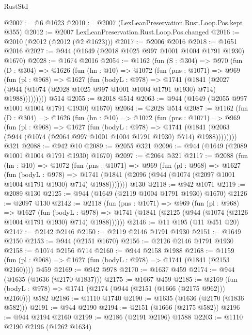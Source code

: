 \begin{lexlean}{RustStd}
\begin{coremodule}
@2007 := @6 @1623
@2010 := @2007 (LexLeanPreservation.Rust.Loop.Pos.kept @355)
@2012 := @2007 LexLeanPreservation.Rust.Loop.Pos.changed
@2016 := @2010 (@2012 (@2012 (@2 @1623)))
@2017 := @2006 @2016
@2018 := @1651 @2016
@2027 := @944 (@1649 (@2018 @1025 @997 @1001 @1004 @1791 @1930) @1670)
@2028 := @1674 @2016
@2054 := @1162
    (fun (S : @304) =>
    @970
      (fun (D : @304) =>
      @1626
        (fun (hn : @10) =>
        @1072
          (fun (pns : @1071) =>
          @969
            (fun (pl : @968) =>
            @1627
              (fun (bodyL : @978) =>
              @1741
                (@1841
                  (@2027
                    (@944 (@1074 (@2028 @1025 @997 @1001 @1004 @1791 @1930) @714) @1988)))))))))
    @514
@2055 := @2018 @514
@2063 := @944 (@1649 (@2055 @997 @1001 @1004 @1791 @1930) @1670)
@2064 := @2028 @514
@2087 := @1162
    (fun (D : @304) =>
    @1626
      (fun (hn : @10) =>
      @1072
        (fun (pns : @1071) =>
        @969
          (fun (pl : @968) =>
          @1627
            (fun (bodyL : @978) =>
            @1741
              (@1841 (@2063 (@944 (@1074 (@2064 @997 @1001 @1004 @1791 @1930) @714) @1988))))))))
    @321
@2088 := @942 @10
@2089 := @2055 @321
@2096 := @944 (@1649 (@2089 @1001 @1004 @1791 @1930) @1670)
@2097 := @2064 @321
@2117 := @2088
    (fun (hn : @10) =>
    @1072
      (fun (pns : @1071) =>
      @969
        (fun (pl : @968) =>
        @1627
          (fun (bodyL : @978) =>
          @1741 (@1841 (@2096 (@944 (@1074 (@2097 @1001 @1004 @1791 @1930) @714) @1988)))))))
    @130
@2118 := @942 @1071
@2119 := @2089 @130
@2125 := @944 (@1649 (@2119 @1004 @1791 @1930) @1670)
@2126 := @2097 @130
@2142 := @2118
    (fun (pns : @1071) =>
    @969
      (fun (pl : @968) =>
      @1627
        (fun (bodyL : @978) =>
        @1741 (@1841 (@2125 (@944 (@1074 (@2126 @1004 @1791 @1930) @714) @1988))))))
@2146 := @11 @195 (@11 @451 @20)
@2147 := @2142 @2146
@2150 := @2119 @2146 @1791 @1930
@2151 := @1649 @2150
@2153 := @944 (@2151 @1670)
@2156 := @2126 @2146 @1791 @1930
@2158 := @1074 @2156 @714
@2160 := @944 @2158 @1988
@2168 := @1159 (fun (pl : @968) => @1627 (fun (bodyL : @978) => @1741 (@1841 (@2153 @2160)))) @459
@2169 := @942 @978
@2170 := @1637 @459
@2174 := @944 (@1635 (@1636 (@2170 @1837)))
@2175 := @1667 @459
@2185 := @2169 (fun (bodyL : @978) => @1741 (@2174 (@944 (@2151 (@1666 (@2175 @962))) @2160))) @582
@2186 := @1110 @1740
@2190 := @1635 (@1636 (@2170 (@1836 @582)))
@2191 := @944 @2190
@2194 := @2151 (@1666 (@2175 @582))
@2196 := @944 @2194 @2160
@2199 := @2186 (@2191 @2196) @1588
@2203 := @1110 @2190 @2196 (@1262 @1634)

\end{coremodule}
\end{lexlean}
